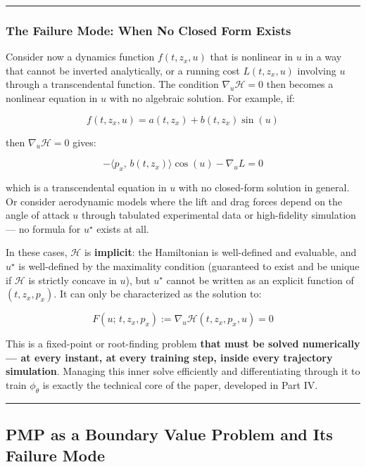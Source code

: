 \documentclass{article}
\begin{document}
\medskip\hrule\medskip

\subsubsection{The Failure Mode: When No Closed Form Exists}

\begin{tldrbox}
Consider now a dynamics function $f(t, z_x, u)$ that is nonlinear in $u$ in a way that cannot be inverted analytically, or a running cost $L(t, z_x, u)$ involving $u$ through a transcendental function. The condition $\nabla_u \mathcal{H} = 0$ then becomes a nonlinear equation in $u$ with no algebraic solution. For example, if:

$$f(t, z_x, u) = a(t, z_x) + b(t, z_x) \sin(u)$$

then $\nabla_u \mathcal{H} = 0$ gives:

$$-\langle p_x,\, b(t, z_x) \rangle \cos(u) - \nabla_u L = 0$$

which is a transcendental equation in $u$ with no closed-form solution in general. Or consider aerodynamic models where the lift and drag forces depend on the angle of attack $u$ through tabulated experimental data or high-fidelity simulation — no formula for $u^\star$ exists at all.

In these cases, $\mathcal{H}$ is \textbf{implicit}: the Hamiltonian is well-defined and evaluable, and $u^\star$ is well-defined by the maximality condition (guaranteed to exist and be unique if $\mathcal{H}$ is strictly concave in $u$), but $u^\star$ cannot be written as an explicit function of $(t, z_x, p_x)$. It can only be characterized as the solution to:

$$F(u;\, t, z_x, p_x) := \nabla_u \mathcal{H}(t, z_x, p_x, u) = 0$$

This is a fixed-point or root-finding problem \textbf{that must be solved numerically — at every instant, at every training step, inside every trajectory simulation}. Managing this inner solve efficiently and differentiating through it to train $\phi_\theta$ is exactly the technical core of the paper, developed in Part IV.
\end{tldrbox}

\medskip\hrule\medskip

\subsection{PMP as a Boundary Value Problem and Its Failure Mode}
\label{sec:pmp-bvp-failure}
\end{document}
